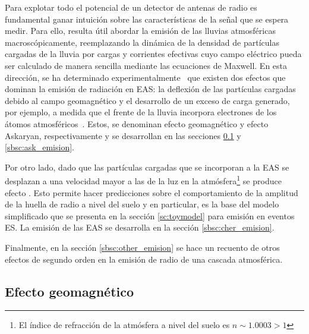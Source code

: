 Para explotar todo el potencial de un detector de antenas de radio es fundamental ganar intuici\'on sobre las caracter\'isticas de la se\~nal que se espera medir.
Para ello, resulta \'util abordar la emisi\'on de las lluvias atmosf\'ericas macrosc\'opicamente, reemplazando la din\'amica de la densidad de part\'iculas cargadas de la lluvia por cargas y corrientes efectivas cuyo campo el\'ectrico pueda ser calculado de manera sencilla mediante las ecuaciones de Maxwell.
En esta direcci\'on, se ha determinado experimentalmente~\cite{ardouin2005radio,huege2012lopes,horandel2009lofar,schroder2013tunka,kelley2011aera,} que existen dos efectos que dominan la emisi\'on de radiaci\'on en EAS: la deflexi\'on de las part\'iculas cargadas debido al campo geomagn\'etico y el desarrollo de un exceso de carga generado, por ejemplo, a medida que el frente de la lluvia incorpora electrones de los \'atomos atmosf\'ericos~\cite{scholten:2008}.
Estos, se denominan efecto geomagn\'etico y efecto Askaryan, respectivamente y se desarrollan en las secciones \ref{sbsc:geom_emision} y \ref{sbsc:ask_emision}.

Por otro lado, dado que las part\'iculas cargadas que se incorporan a la EAS se desplazan a una velocidad mayor a las de la luz en la atm\'osfera\footnote{El \'indice de refracci\'on de la atm\'osfera a nivel del suelo es $n\sim1.0003>1$} se produce efecto \cher{}.
Esto permite hacer predicciones sobre el comportamiento de la amplitud de la huella de radio a nivel del suelo y en particular, es la base del modelo simplificado que se presenta en la secci\'on \ref{sc:toymodel} para emisi\'on en eventos ES. 
La emisi\'on \cher{} de las EAS se desarrolla en la secci\'on \ref{sbsc:cher_emision}.

Finalmente, en la secci\'on \ref{sbsc:other_emision} se hace un recuento de otros efectos de segundo orden en la emisi\'on de radio de una cascada atmosf\'erica.

\subsection{Efecto geomagn\'etico}
\label{sbsc:geom_emision}
	
